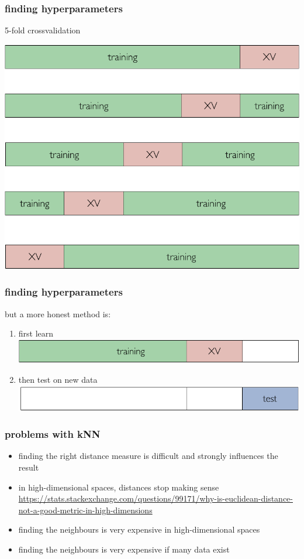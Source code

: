 \documentclass[USenglish,pdftex,compress,10pt,svgnamesi]{beamer}%
\begin{document}
 
\begin{frame}
\frametitle{finding hyperparameters}
5-fold crossvalidation

 \includegraphics[scale=0.5]{xv2}

\end{frame}


\begin{frame}
\frametitle{finding hyperparameters}
but a more honest method is:
\begin{enumerate}
\item first learn\\
 \includegraphics[scale=0.5]{xv3}
 \bigskip
\item \pause then test on new data\\
 \includegraphics[scale=0.5]{xv4}
\end{enumerate}

\end{frame}



\begin{frame}
\frametitle{problems with kNN}

\begin{itemize}
\item finding the right distance measure is difficult and strongly influences the result
\item in high-dimensional spaces, distances stop making sense
{\tiny \url{https://stats.stackexchange.com/questions/99171/why-is-euclidean-distance-not-a-good-metric-in-high-dimensions}}
\item finding the neighbours is very  expensive in high-dimensional spaces
\item finding the neighbours is  very expensive if many data exist
\end{itemize}
\end{frame}
\end{document}
